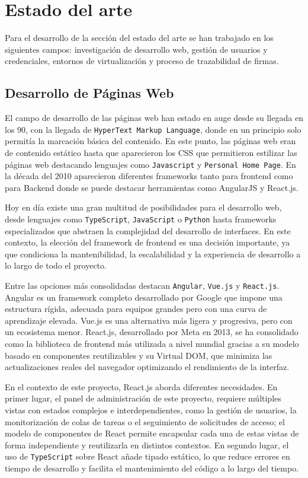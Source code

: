 \chapter{Estado del arte}

Para el desarrollo de la sección del estado del arte se han trabajado en los siguientes campos: investigación de desarrollo web, gestión de usuarios y credenciales, entornos de virtualización y proceso de trazabilidad de firmas.

\section{Desarrollo de Páginas Web}

El campo de desarrollo de las páginas web han estado en auge desde su llegada en los 90, con la llegada de \texttt{HyperText Markup Language}, donde en un principio solo permitía la marcación básica del contenido. En este punto, las páginas web eran de contenido estático hasta que aparecieron los CSS que permitieron estilizar las páginas web destacando lenguajes como \texttt{Javascript} y \texttt{Personal Home Page}. En la década del 2010 aparecieron diferentes frameworks tanto para frontend como para Backend donde se puede destacar herramientas como AngularJS y React.js.\cite{armadillo_amarillo_evolucion_web} 


Hoy en día existe una gran multitud de posibilidades para el desarrollo web,
desde lenguajes como \texttt{TypeScript}, \texttt{JavaScript} o \texttt{Python}
hasta frameworks especializados que abstraen la complejidad del desarrollo de
interfaces. En este contexto, la elección del framework de frontend es una
decisión importante, ya que condiciona la mantenibilidad, la escalabilidad y la
experiencia de desarrollo a lo largo de todo el proyecto.

Entre las opciones más consolidadas destacan \texttt{Angular}, \texttt{Vue.js}
y \texttt{React.js}. Angular es un framework completo desarrollado por Google
que impone una estructura rígida, adecuada para equipos grandes pero con una
curva de aprendizaje elevada. Vue.js es una alternativa más ligera y progresiva,
pero con un ecosistema menor. React.js, desarrollado por Meta en 2013,
se ha consolidado como la biblioteca de frontend más utilizada a nivel mundial
gracias a su modelo basado en componentes reutilizables y su
Virtual DOM, que minimiza las actualizaciones reales del navegador
optimizando el rendimiento de la interfaz. \cite{react_meta_docs}

En el contexto de este proyecto, React.js aborda diferentes necesidades.
En primer lugar, el panel de administración de este proyecto, requiere múltiples vistas
con estados complejos e interdependientes, como la gestión de usuarios, la
monitorización de colas de tareas o el seguimiento de solicitudes de acceso;
el modelo de componentes de React permite encapsular cada una de estas vistas
de forma independiente y reutilizarla en distintos contextos. En segundo lugar,
el uso de \texttt{TypeScript} sobre React añade tipado estático, lo que reduce
errores en tiempo de desarrollo y facilita el mantenimiento del código a lo
largo del tiempo.


